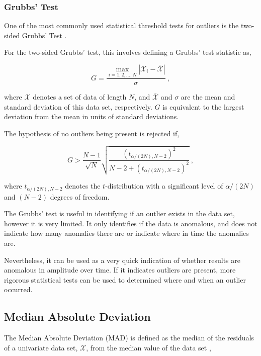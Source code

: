 \subsubsection{Grubbs' Test}
One of the most commonly used statistical threshold tests for outliers is the two-sided Grubbs' Test \cite{CIS-320511}.

For the two-sided Grubbs' test, this involves defining a Grubbs' test statistic as,

\begin{equation}
    G = \dfrac{\underset{i=1,2,...,N}{\max}|\mathcal{X}_i-\bar{\mathcal{X}}|}{\sigma}~,
    \label{eq:grubbs}
\end{equation}

where $\mathcal{X}$ denotes a set of data of length $N$, and $\bar{\mathcal{X}}$ and $\sigma$ are the mean and standard deviation of this data set, respectively. $G$ is equivalent to the largest deviation from the mean in units of standard deviations.  

The hypothesis of no outliers being present is rejected if,

\begin{equation}
    G > \dfrac{N-1}{\sqrt{N}} \sqrt{\dfrac{(t_{\alpha/(2N), N-2})^2}{N-2+(t_{\alpha/(2N), N-2})^2}} ~,
    \label{grubbs_condition}
\end{equation}

where $t_{\alpha/(2N), N-2}$ denotes the $t$-distribution with a significant level of $\alpha/(2N)$ and $(N-2)$ degrees of freedom. 

The Grubbs' test is useful in identifying if an outlier exists in the data set, however it is very limited. It only identifies if the data is anomalous, and does not indicate how many anomalies there are or indicate where in time the anomalies are.

Nevertheless, it can be used as a very quick indication of whether results are anomalous in amplitude over time. If it indicates outliers are present, more rigorous statistical tests can be used to determined where and when an outlier occurred. 

\subsection{Median Absolute Deviation}

The Median Absolute Deviation (MAD) is defined as the median of the residuals of a univariate data set, $\mathcal{X}$, from the median value of the data set \cite{rousseeuw1993alternatives},


